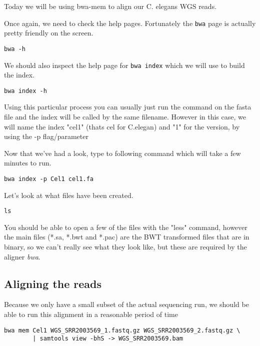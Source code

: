 Today we will be using bwa-mem to align our C. elegans WGS reads.

\begin{steps}
Once again, we need to check the help pages.
Fortunately the \texttt{bwa} page is actually pretty friendly on the screen. \\
\begin{lstlisting}
bwa -h
\end{lstlisting}

We should also inspect the help page for \texttt{bwa index} which we will use to build the index.\\
\begin{lstlisting}
bwa index -h
\end{lstlisting}
Using this particular process you can usually just run the command on the fasta file and the index will be called by the same filename. However in this case, we will name the index "cel1" (thats cel for C.elegan) and "1" for the version, by using the -p flag/parameter
\end{steps}

\begin{steps}
Now that we've had a look, type to following command which will take a few minutes to run.
\begin{lstlisting}
bwa index -p Cel1 cel1.fa
\end{lstlisting}
\end{steps}

\begin{steps}
Let's look at what files have been created.
\begin{lstlisting}
ls
\end{lstlisting}
You should be able to open a few of the files with the "less" command, however the main files (*.sa, *.bwt and *.pac) are the BWT transformed files that are in binary, so we can't really see what they look like, but these are required by the aligner \textit{bwa}.
\end{steps}

\subsection{Aligning the reads}
Because we only have a small subset of the actual sequencing run, we should be able to run this alignment in a reasonable period of time
\begin{lstlisting}[style=command_syntax]
bwa mem Cel1 WGS_SRR2003569_1.fastq.gz WGS_SRR2003569_2.fastq.gz \
        | samtools view -bhS -> WGS_SRR2003569.bam
\end{lstlisting}

